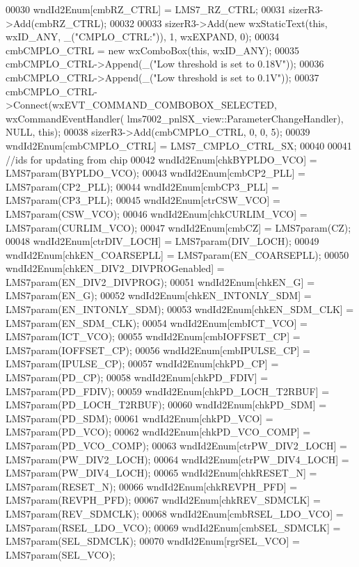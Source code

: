 \begin{DoxyCode}
00030     wndId2Enum[cmbRZ_CTRL] = LMS7_RZ_CTRL;
00031     sizerR3->Add(cmbRZ_CTRL);
00032 
00033     sizerR3->Add(\textcolor{keyword}{new} wxStaticText(\textcolor{keyword}{this}, wxID\_ANY, \_(\textcolor{stringliteral}{"CMPLO\_CTRL:"})), 1, wxEXPAND, 0);
00034     cmbCMPLO_CTRL = \textcolor{keyword}{new} wxComboBox(\textcolor{keyword}{this}, wxID\_ANY);
00035     cmbCMPLO_CTRL->Append(\_(\textcolor{stringliteral}{"Low threshold is set to 0.18V"}));
00036     cmbCMPLO_CTRL->Append(\_(\textcolor{stringliteral}{"Low threshold is set to 0.1V"}));
00037     cmbCMPLO_CTRL->Connect(wxEVT\_COMMAND\_COMBOBOX\_SELECTED, wxCommandEventHandler(
      lms7002_pnlSX_view::ParameterChangeHandler), NULL, \textcolor{keyword}{this});
00038     sizerR3->Add(cmbCMPLO_CTRL, 0, 0, 5);
00039     wndId2Enum[cmbCMPLO_CTRL] = LMS7_CMPLO_CTRL_SX;
00040 
00041     \textcolor{comment}{//ids for updating from chip}
00042     wndId2Enum[chkBYPLDO_VCO] = LMS7param(BYPLDO_VCO);
00043     wndId2Enum[cmbCP2_PLL] = LMS7param(CP2_PLL);
00044     wndId2Enum[cmbCP3_PLL] = LMS7param(CP3_PLL);
00045     wndId2Enum[ctrCSW_VCO] = LMS7param(CSW_VCO);
00046     wndId2Enum[chkCURLIM_VCO] = LMS7param(CURLIM_VCO);
00047     wndId2Enum[cmbCZ] = LMS7param(CZ);
00048     wndId2Enum[ctrDIV_LOCH] = LMS7param(DIV_LOCH);
00049     wndId2Enum[chkEN_COARSEPLL] = LMS7param(EN_COARSEPLL);
00050     wndId2Enum[chkEN_DIV2_DIVPROGenabled] = LMS7param(EN_DIV2_DIVPROG);
00051     wndId2Enum[chkEN_G] = LMS7param(EN_G);
00052     wndId2Enum[chkEN_INTONLY_SDM] = LMS7param(EN_INTONLY_SDM);
00053     wndId2Enum[chkEN_SDM_CLK] = LMS7param(EN_SDM_CLK);
00054     wndId2Enum[cmbICT_VCO] = LMS7param(ICT_VCO);
00055     wndId2Enum[cmbIOFFSET_CP] = LMS7param(IOFFSET_CP);
00056     wndId2Enum[cmbIPULSE_CP] = LMS7param(IPULSE_CP);
00057     wndId2Enum[chkPD_CP] = LMS7param(PD_CP);
00058     wndId2Enum[chkPD_FDIV] = LMS7param(PD_FDIV);
00059     wndId2Enum[chkPD_LOCH_T2RBUF] = LMS7param(PD_LOCH_T2RBUF);
00060     wndId2Enum[chkPD_SDM] = LMS7param(PD_SDM);
00061     wndId2Enum[chkPD_VCO] = LMS7param(PD_VCO);
00062     wndId2Enum[chkPD_VCO_COMP] = LMS7param(PD_VCO_COMP);
00063     wndId2Enum[ctrPW_DIV2_LOCH] = LMS7param(PW_DIV2_LOCH);
00064     wndId2Enum[ctrPW_DIV4_LOCH] = LMS7param(PW_DIV4_LOCH);
00065     wndId2Enum[chkRESET_N] = LMS7param(RESET_N);
00066     wndId2Enum[chkREVPH_PFD] = LMS7param(REVPH_PFD);
00067     wndId2Enum[chkREV_SDMCLK] = LMS7param(REV_SDMCLK);
00068     wndId2Enum[cmbRSEL_LDO_VCO] = LMS7param(RSEL_LDO_VCO);
00069     wndId2Enum[cmbSEL_SDMCLK] = LMS7param(SEL_SDMCLK);
00070     wndId2Enum[rgrSEL_VCO] = LMS7param(SEL_VCO);

\end{DoxyCode}
